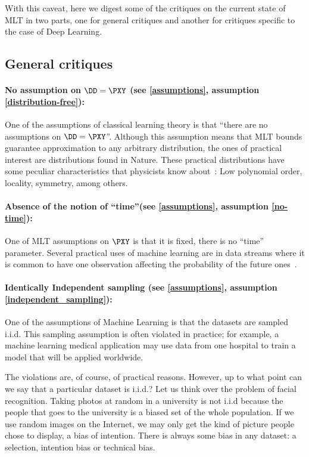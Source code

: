 With this caveat, here we digest some of the critiques on the current state of MLT in two parts, one for general critiques and another for critiques specific to the case of Deep Learning.

\subsection{General critiques}\label{sec:general_critiques}
\paragraph{No assumption on \(\DD=\PXY\) (see \ref{assumptions}, assumption \ref{distribution-free}): } One of the assumptions of classical learning theory is that ``there are no assumptions on \(\DD=\PXY\)''. Although this assumption means that MLT bounds guarantee approximation to any arbitrary distribution, the ones of practical interest are distributions found in Nature. These practical distributions have some peculiar characteristics that physicists know about~\cite{lin:2016}: Low polynomial order, locality, symmetry, among others.
\paragraph{Absence of the notion of ``time''(see \ref{assumptions}, assumption \ref{no-time}): } One of MLT assumptions on \(\PXY\) is that it is fixed, there is no ``time'' parameter. Several practical uses of machine learning are in data streams where it is common to have one observation affecting the probability of the future ones~\cite{mello:2018}.
\paragraph{Identically Independent sampling (see \ref{assumptions}, assumption \ref{independent_sampling}): } One of the assumptions of Machine Learning is that the datasets are sampled i.i.d. This sampling assumption is often violated in practice; for example, a machine learning medical application may use data from one hospital to train a model that will be applied worldwide.

The violations are, of course, of practical reasons. However, up to what point can we say that a particular dataset is i.i.d.? Let us think over the problem of facial recognition. Taking photos at random in a university is not i.i.d because the people that goes to the university is a biased set of the whole population. If we use random images on the Internet, we may only get the kind of picture people chose to display, a bias of intention. There is always some bias in any dataset: a selection, intention bias or technical bias.


